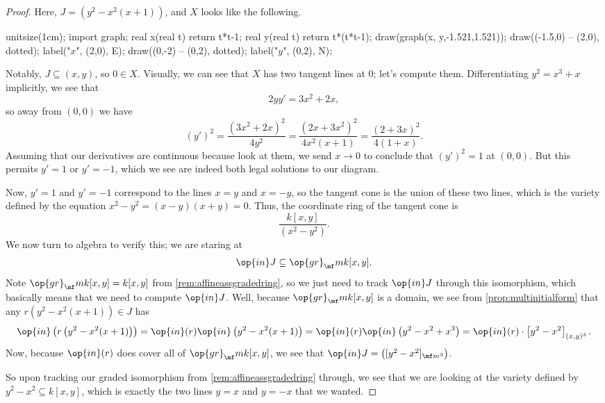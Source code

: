 \begin{proof}
	Here, $J=\left(y^2-x^2(x+1)\right)$, and $X$ looks like the following.
	\begin{center}
		\begin{asy}
			unitsize(1cm);
			import graph;
			real x(real t)
			{
				return t*t-1;
			}
			real y(real t)
			{
				return t*(t*t-1);
			}
			draw(graph(x, y,-1.521,1.521));
			draw((-1.5,0) -- (2,0), dotted); label("$x$", (2,0), E);
			draw((0,-2) -- (0,2), dotted); label("$y$", (0,2), N);
		\end{asy}
	\end{center}
	Notably, $J\subseteq(x,y)$, so $0\in X$. Visually, we can see that $X$ has two tangent lines at $0$; let's compute them. Differentiating $y^2=x^3+x$ implicitly, we see that
	\[2yy'=3x^2+2x,\]
	so away from $(0,0)$ we have
	\[(y')^2=\frac{\left(3x^2+2x\right)^2}{4y^2}=\frac{\left(2x+3x^2\right)^2}{4x^2(x+1)}=\frac{(2+3x)^2}{4(1+x)}.\]
	Assuming that our derivatives are continuous because look at them, we send $x\to0$ to conclude that $(y')^2=1$ at $(0,0)$. But this permits $y'=1$ or $y'=-1$, which we see are indeed both legal solutions to our diagram.

	Now, $y'=1$ and $y'=-1$ correspond to the lines $x=y$ and $x=-y$, so the tangent cone is the union of these two lines, which is the variety defined by the equation $x^2-y^2=(x-y)(x+y)=0$. Thus, the coordinate ring of the tangent cone is
	\[\frac{k[x,y]}{\left(x^2-y^2\right)}.\]
	We now turn to algebra to verify this; we are staring at
	\[\op{in}J\subseteq\op{gr}_\mf mk[x,y].\]
	Note $\op{gr}_\mf mk[x,y]=k[x,y]$ from \autoref{rem:affineassgradedring}, so we just need to track $\op{in}J$ through this isomorphism, which basically means that we need to compute $\op{in}J$. Well, because $\op{gr}_\mf mk[x,y]$ is a domain, we see from \autoref{prop:multinitialform} that any $r\left(y^2-x^2(x+1)\right)\in J$ has
	\[\op{in}\left(r\left(y^2-x^2(x+1)\right)\right)=\op{in}(r)\op{in}\left(y^2-x^2(x+1)\right)=\op{in}(r)\op{in}\left(y^2-x^2+x^3\right)=\op{in}(r)\cdot\left[y^2-x^2\right]_{(x,y)^3}.\]
	Now, because $\op{in}(r)$ does cover all of $\op{gr}_\mf mk[x,y]$, we see that $\op{in}J=\left([y^2-x^2]_{\mf m^3}\right)$.
	
	So upon tracking our graded isomorphism from \autoref{rem:affineassgradedring} through, we see that we are looking at the variety defined by $y^2-x^2\subseteq k[x,y]$, which is exactly the two lines $y=x$ and $y=-x$ that we wanted.
\end{proof}


